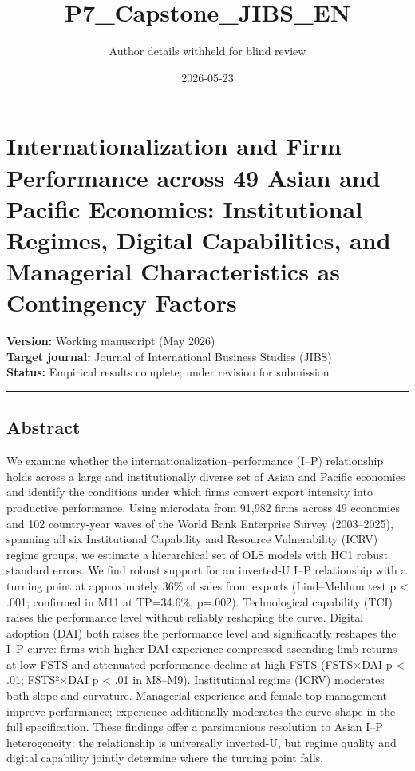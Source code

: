 \documentclass[12pt,a4paper]{article}
\title{P7\_Capstone\_JIBS\_EN}
\author{Author details withheld for blind review}
\date{2026-05-23}
\begin{document}
\maketitle

\hypertarget{internationalization-and-firm-performance-across-49-asian-and-pacific-economies-institutional-regimes-digital-capabilities-and-managerial-characteristics-as-contingency-factors}{%
\section{Internationalization and Firm Performance across 49 Asian and
Pacific Economies: Institutional Regimes, Digital Capabilities, and
Managerial Characteristics as Contingency
Factors}\label{internationalization-and-firm-performance-across-49-asian-and-pacific-economies-institutional-regimes-digital-capabilities-and-managerial-characteristics-as-contingency-factors}}

\textbf{Version:} Working manuscript (May 2026)\\
\textbf{Target journal:} Journal of International Business Studies
(JIBS)\\
\textbf{Status:} Empirical results complete; under revision for
submission

\begin{center}\rule{0.5\linewidth}{0.5pt}\end{center}

\hypertarget{abstract}{%
\subsection{Abstract}\label{abstract}}

We examine whether the internationalization--performance (I--P)
relationship holds across a large and institutionally diverse set of
Asian and Pacific economies and identify the conditions under which
firms convert export intensity into productive performance. Using
microdata from 91,982 firms across 49 economies and 102 country-year
waves of the World Bank Enterprise Survey (2003--2025), spanning all six
Institutional Capability and Resource Vulnerability (ICRV) regime
groups, we estimate a hierarchical set of OLS models with HC1 robust
standard errors. We find robust support for an inverted-U I--P
relationship with a turning point at approximately 36\% of sales from
exports (Lind--Mehlum test p \textless{} .001; confirmed in M11 at
TP=34.6\%, p=.002). Technological capability (TCI) raises the
performance level without reliably reshaping the curve. Digital adoption
(DAI) both raises the performance level and significantly reshapes the
I--P curve: firms with higher DAI experience compressed ascending-limb
returns at low FSTS and attenuated performance decline at high FSTS
(FSTS×DAI p \textless{} .01; FSTS²×DAI p \textless{} .01 in M8--M9).
Institutional regime (ICRV) moderates both slope and curvature.
Managerial experience and female top management improve performance;
experience additionally moderates the curve shape in the full
specification. These findings offer a parsimonious resolution to Asian
I--P heterogeneity: the relationship is universally inverted-U, but
regime quality and digital capability jointly determine where the
turning point falls.
\end{document}
